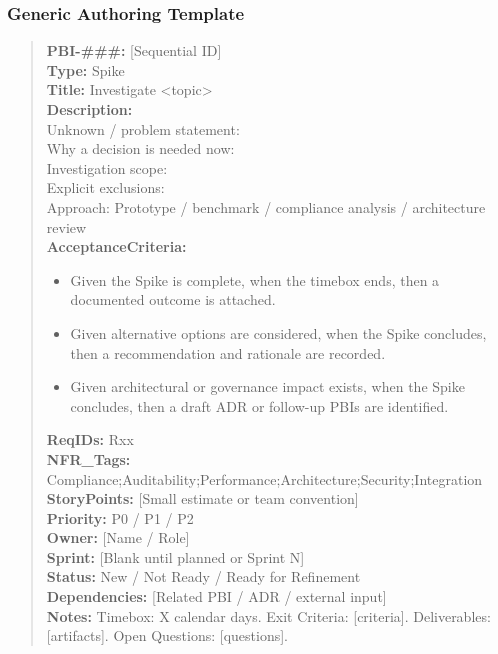 \documentclass[11pt,a4paper]{article}
\begin{document}
\subsubsection*{Generic Authoring Template}
\begin{quote}
\textbf{PBI-\#\#\#:} [Sequential ID] \\
\textbf{Type:} Spike \\
\textbf{Title:} Investigate \textless topic\textgreater \\

\textbf{Description:} \\
Unknown / problem statement: \\
Why a decision is needed now: \\
Investigation scope: \\
Explicit exclusions: \\
Approach: Prototype / benchmark / compliance analysis / architecture review \\

\textbf{AcceptanceCriteria:}
\begin{itemize}[leftmargin=1.5em]
    \item Given the Spike is complete, when the timebox ends, then a documented outcome is attached.
    \item Given alternative options are considered, when the Spike concludes, then a recommendation and rationale are recorded.
    \item Given architectural or governance impact exists, when the Spike concludes, then a draft ADR or follow-up PBIs are identified.
\end{itemize}

\textbf{ReqIDs:} Rxx \\
\textbf{NFR\_Tags:} Compliance;Auditability;Performance;Architecture;Security;Integration \\
\textbf{StoryPoints:} [Small estimate or team convention] \\
\textbf{Priority:} P0 / P1 / P2 \\
\textbf{Owner:} [Name / Role] \\
\textbf{Sprint:} [Blank until planned or Sprint N] \\
\textbf{Status:} New / Not Ready / Ready for Refinement \\
\textbf{Dependencies:} [Related PBI / ADR / external input] \\
\textbf{Notes:} Timebox: X calendar days. Exit Criteria: [criteria]. Deliverables: [artifacts]. Open Questions: [questions].
\end{quote}
\end{document}
